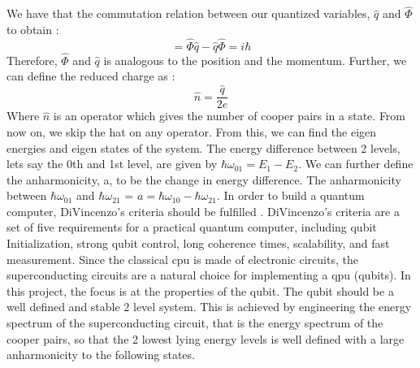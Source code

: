     We have that the commutation relation between our quantized  variables, $\hat{q}$ and $\hat{\Phi}$ to obtain \cite{Girvin2014}:
    \begin{equation}
        [\hat{\Phi}, \hat{q}] = \hat{\Phi} \hat{q} -\hat{q} \hat{\Phi} = i \hbar
    \end{equation}
    Therefore, $\hat{\Phi}$ and $\hat{q}$ is analogous to the position and the momentum. Further, we can define the reduced charge as \cite{Girvin2014}: 
    \begin{equation}
        \hat{n} = \frac{\hat{q}}{2e}
    \end{equation}
    Where $\hat{n}$ is an operator which gives the number of cooper pairs in a state. From now on, we skip the hat on any operator. From this, we can find the eigen energies and eigen states of the system. The energy difference between 2 levels, lets say the 0th and 1st level, are given by $\hbar \omega_{01} = E_1 - E_2 $. We can further define the anharmonicity, a, to be the change in energy difference. The anharmonicity between $\hbar\omega_{01}$ and $\hbar\omega_{21}$ = $a = \hbar\omega_{10}-\hbar\omega_{21}$. 
    \newline
    \newline
    In order to build a quantum computer, DiVincenzo's criteria should be fulfilled \cite{DiVincenzo2000}. DiVincenzo's criteria are a set of five requirements for a practical quantum computer, including qubit Initialization, strong qubit control, long coherence times, scalability, and fast measurement. Since the classical \acrshort{cpu} is made of electronic circuits, the superconducting circuits are a natural choice for implementing a \acrshort{qpu} (qubits). In this project, the focus is at the properties of the qubit. The qubit should be a well defined and stable 2 level system. This is achieved by engineering the energy spectrum of the superconducting circuit, that is the energy spectrum of the cooper pairs, so that the 2 lowest lying energy levels is well defined with a large anharmonicity to the following states.
